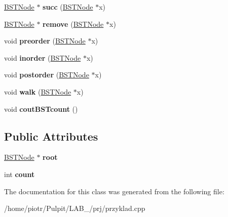 \begin{DoxyCompactItemize}
\item 
\hypertarget{class_b_s_t_a10a4ef20ef7c70ab27440dd644dfbc7c}{\hyperlink{struct_b_s_t_node}{\-B\-S\-T\-Node} $\ast$ {\bfseries succ} (\hyperlink{struct_b_s_t_node}{\-B\-S\-T\-Node} $\ast$x)}\label{class_b_s_t_a10a4ef20ef7c70ab27440dd644dfbc7c}

\item 
\hypertarget{class_b_s_t_a5fbef6c56bb7ea3b46c0a95e0bd065bf}{\hyperlink{struct_b_s_t_node}{\-B\-S\-T\-Node} $\ast$ {\bfseries remove} (\hyperlink{struct_b_s_t_node}{\-B\-S\-T\-Node} $\ast$x)}\label{class_b_s_t_a5fbef6c56bb7ea3b46c0a95e0bd065bf}

\item 
\hypertarget{class_b_s_t_a2815b0553e8d0d229fac11ff760f2e3c}{void {\bfseries preorder} (\hyperlink{struct_b_s_t_node}{\-B\-S\-T\-Node} $\ast$x)}\label{class_b_s_t_a2815b0553e8d0d229fac11ff760f2e3c}

\item 
\hypertarget{class_b_s_t_ae2c133fea33a6c173152db5f6da14075}{void {\bfseries inorder} (\hyperlink{struct_b_s_t_node}{\-B\-S\-T\-Node} $\ast$x)}\label{class_b_s_t_ae2c133fea33a6c173152db5f6da14075}

\item 
\hypertarget{class_b_s_t_ad6d57ea21e31bd61e3bf9c4efe885864}{void {\bfseries postorder} (\hyperlink{struct_b_s_t_node}{\-B\-S\-T\-Node} $\ast$x)}\label{class_b_s_t_ad6d57ea21e31bd61e3bf9c4efe885864}

\item 
\hypertarget{class_b_s_t_ad665284d774b80365fe1c443706c7e2a}{void {\bfseries walk} (\hyperlink{struct_b_s_t_node}{\-B\-S\-T\-Node} $\ast$x)}\label{class_b_s_t_ad665284d774b80365fe1c443706c7e2a}

\item 
\hypertarget{class_b_s_t_abacdf2abf888303c84e9760eb8d9565f}{void {\bfseries cout\-B\-S\-Tcount} ()}\label{class_b_s_t_abacdf2abf888303c84e9760eb8d9565f}

\end{DoxyCompactItemize}
\subsection*{\-Public \-Attributes}
\begin{DoxyCompactItemize}
\item 
\hypertarget{class_b_s_t_abc7f42eb746e16489298763934fd8340}{\hyperlink{struct_b_s_t_node}{\-B\-S\-T\-Node} $\ast$ {\bfseries root}}\label{class_b_s_t_abc7f42eb746e16489298763934fd8340}

\item 
\hypertarget{class_b_s_t_ae9c1abeb913d164828a5abe32dd7c89a}{int {\bfseries count}}\label{class_b_s_t_ae9c1abeb913d164828a5abe32dd7c89a}

\end{DoxyCompactItemize}


\-The documentation for this class was generated from the following file\-:\begin{DoxyCompactItemize}
\item 
/home/piotr/\-Pulpit/\-L\-A\-B\-\_/prj/przyklad.\-cpp\end{DoxyCompactItemize}
